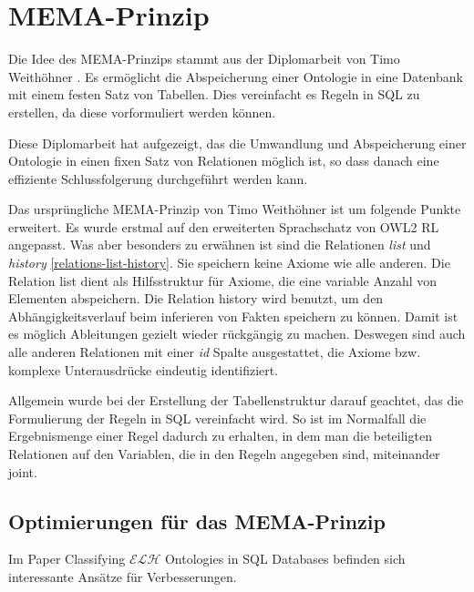 \section{MEMA-Prinzip}
\label{abschnitt-mema-prinzip}
Die Idee des MEMA-Prinzips stammt aus der Diplomarbeit von Timo Weithöhner \cite{Weithoehner2003}. Es ermöglicht die Abspeicherung einer Ontologie in eine Datenbank mit einem festen Satz von Tabellen. Dies vereinfacht es Regeln in SQL zu erstellen, da diese vorformuliert werden können.

Diese Diplomarbeit hat aufgezeigt, das die Umwandlung und Abspeicherung einer Ontologie in einen fixen Satz von Relationen möglich ist, so dass danach eine effiziente Schlussfolgerung durchgeführt werden kann.

Das ursprüngliche MEMA-Prinzip von Timo Weithöhner ist um folgende Punkte erweitert.
Es wurde erstmal auf den erweiterten Sprachschatz von OWL2 RL angepasst. Was aber besonders zu erwähnen ist sind die Relationen \emph{list} und \emph{history} \ref{relations-list-history}. Sie speichern keine Axiome wie alle anderen. Die Relation list dient als Hilfsstruktur für Axiome, die eine variable Anzahl von Elementen abspeichern. Die Relation history wird benutzt, um den Abhängigkeitsverlauf beim inferieren von Fakten speichern zu können. Damit ist es möglich Ableitungen gezielt wieder rückgängig zu machen. Deswegen sind auch alle anderen Relationen mit einer \emph{id} Spalte ausgestattet, die Axiome bzw. komplexe Unterausdrücke eindeutig identifiziert.

Allgemein wurde bei der Erstellung der Tabellenstruktur darauf geachtet, das die Formulierung der Regeln in SQL vereinfacht wird. So ist im Normalfall die Ergebnismenge einer Regel dadurch zu erhalten, in dem man die beteiligten Relationen auf den Variablen, die in den Regeln angegeben sind, miteinander joint.



\subsection{Optimierungen für das MEMA-Prinzip}

Im Paper Classifying $\mathcal{ELH}$ Ontologies in SQL Databases \cite{Delaitre2009} befinden sich interessante Ansätze für Verbesserungen.

